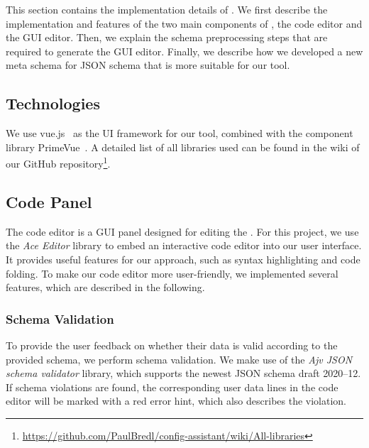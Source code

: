 This section contains the implementation details of \toolname{}.
We first describe the implementation and features of the two main components of \toolname{}, the code editor and the GUI editor.
Then, we explain the schema preprocessing steps that are required to generate the GUI editor.
Finally, we describe how we developed a new meta schema for JSON schema that is more suitable for our tool.

\subsection{Technologies}\label{subsec:technologies}

We use vue.js~\cite{vuejsVuejsProgressive} as the UI framework for our tool, combined with the component library PrimeVue~\cite{primevuePrimeVueComponent}.
A detailed list of all libraries used can be found in the wiki of our GitHub repository\footnote{\url{https://github.com/PaulBredl/config-assistant/wiki/All-libraries}}.




\subsection{Code Panel}\label{subsec:code-editor}

The code editor is a GUI panel designed for editing the \cfgfiles.
For this project, we use the \textit{Ace Editor}\cite{Ace-Editor} library to embed an interactive code editor into our user interface.
It provides useful features for our approach, such as syntax highlighting and code folding.
To make our code editor more user-friendly, we implemented several features, which are described in the following.

\subsubsection{Schema Validation}
To provide the user feedback on whether their data is valid according to the provided schema, we perform schema validation.
We make use of the \textit{Ajv JSON schema validator}\cite{ajv-validator} library, which supports the newest JSON schema draft 2020--12.
If schema violations are found, the corresponding user data lines in the code editor will be marked with a red error hint, which also describes the violation.


